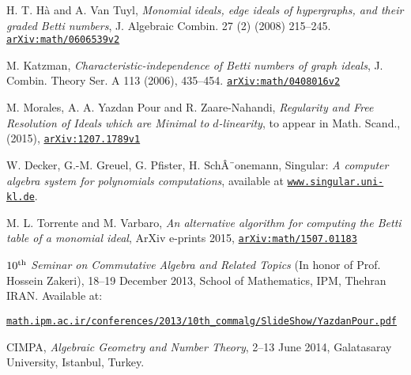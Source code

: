\documentclass[a4paper,11pt]{amsart}
\theoremstyle{plain}
\theoremstyle{definition}
\theoremstyle{remark}
\begin{document}
\begin{thebibliography}{99999}
H. T. H\`a and A. Van Tuyl, \textit{Monomial ideals, edge ideals of hypergraphs, and their graded Betti numbers}, J. Algebraic Combin. 27 (2) (2008) 215--245. \href{http://arxiv.org/abs/math/0606539v2}{\texttt{arXiv:math/0606539v2}}

M. Katzman, \textit{Characteristic-independence of Betti numbers of graph ideals}, J. Combin. Theory Ser. A 113 (2006), 435--454. \href{http://arxiv.org/abs/math/0408016}{\texttt{arXiv:math/0408016v2}}

M. Morales, A. A. Yazdan Pour and R. Zaare-Nahandi, \textit{Regularity and Free Resolution of Ideals which are Minimal to $d$-linearity}, to appear in Math. Scand., (2015), \href{http://arxiv.org/abs/1207.1790}{\texttt{arXiv:1207.1789v1}}

W. Decker, G.-M. Greuel, G. Pfister, H. SchÂ¨onemann, Singular: \textit{A computer algebra system for polynomials computations}, available at \href{http://www.singular.uni-kl.de}{\texttt{www.singular.uni-kl.de}}.

M. L. Torrente and M. Varbaro, \textit{An alternative algorithm for computing the Betti table of a monomial ideal}, ArXiv e-prints 2015, \href{http://arxiv.org/abs/1507.01183}{\texttt{arXiv:math/1507.01183}}

$10^{\rm th}$ \textit{Seminar on Commutative Algebra and Related Topics} (In honor of Prof. Hossein Zakeri), 18--19 December  2013, School of Mathematics, IPM, Thehran IRAN. Available at:\\
\begin{small}
\href{http://math.ipm.ac.ir/conferences/2013/10th\_commalg/SlideShow/YazdanPour.pdf}{\texttt{math.ipm.ac.ir/conferences/2013/10th\_commalg/SlideShow/YazdanPour.pdf}}
\end{small}

CIMPA, \textit{Algebraic Geometry and Number Theory}, 2--13 June 2014, Galatasaray University, Istanbul, Turkey.
\end{thebibliography}
\end{document}

